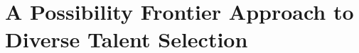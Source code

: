 

\chapter{\label{ch:spf}A Possibility Frontier Approach to Diverse Talent Selection} %

\minitoc



